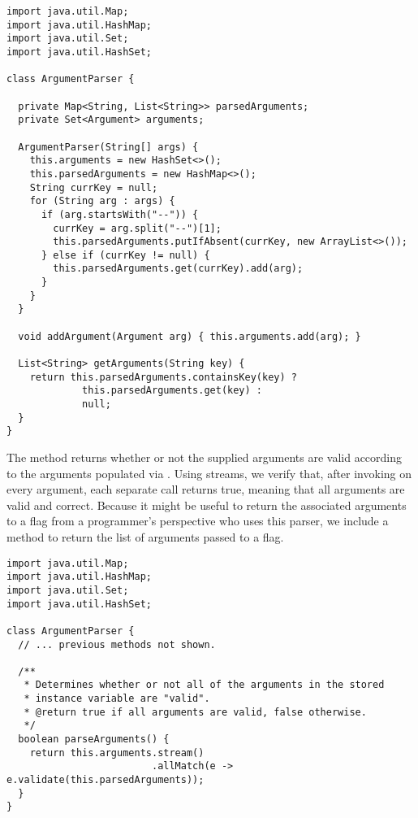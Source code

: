 \begin{lstlisting}[language=MyJava]
import java.util.Map;
import java.util.HashMap;
import java.util.Set;
import java.util.HashSet;

class ArgumentParser {

  private Map<String, List<String>> parsedArguments;
  private Set<Argument> arguments;

  ArgumentParser(String[] args) {
    this.arguments = new HashSet<>();
    this.parsedArguments = new HashMap<>();
    String currKey = null;
    for (String arg : args) {
      if (arg.startsWith("--")) {
        currKey = arg.split("--")[1];
        this.parsedArguments.putIfAbsent(currKey, new ArrayList<>());
      } else if (currKey != null) {
        this.parsedArguments.get(currKey).add(arg);
      }
    }
  }

  void addArgument(Argument arg) { this.arguments.add(arg); }

  List<String> getArguments(String key) {
    return this.parsedArguments.containsKey(key) ? 
             this.parsedArguments.get(key) : 
             null;
  }
}
\end{lstlisting}

The  method returns whether or not the supplied arguments are valid according to the arguments populated via . Using streams, we verify that, after invoking  on every argument, each separate call returns true, meaning that all arguments are valid and correct. Because it might be useful to return the associated arguments to a flag from a programmer's perspective who uses this parser, we include a  method to return the list of arguments passed to a flag.

\begin{lstlisting}[language=MyJava]
import java.util.Map;
import java.util.HashMap;
import java.util.Set;
import java.util.HashSet;

class ArgumentParser {
  // ... previous methods not shown.

  /**
   * Determines whether or not all of the arguments in the stored
   * instance variable are "valid".
   * @return true if all arguments are valid, false otherwise.
   */
  boolean parseArguments() {
    return this.arguments.stream()
                         .allMatch(e -> e.validate(this.parsedArguments));
  }
}
\end{lstlisting}

